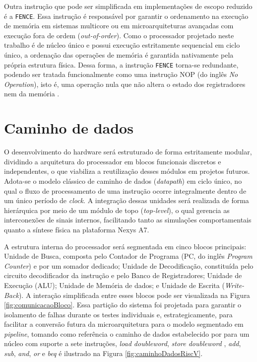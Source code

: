 Outra instrução que pode ser simplificada em implementações de escopo reduzido é a \texttt{FENCE}. Essa instrução é responsável por garantir o ordenamento na execução de memória em sistemas multicore ou em microarquiteturas avançadas com execução fora de ordem (\textit{out-of-order}). Como o processador projetado neste trabalho é de núcleo único e possui execução estritamente sequencial em ciclo único, a ordenação das operações de memória é garantida nativamente pela própria estrutura física. Dessa forma, a instrução \texttt{FENCE} torna-se redundante, podendo ser tratada funcionalmente como uma instrução NOP (do inglês \textit{No Operation}), isto é, uma operação nula que não altera o estado dos registradores nem da memória \cite{riscv_manual_2026}.


\section{Caminho de dados}
\label{sec:desenvolviemnto}

O desenvolvimento do hardware será estruturado de forma estritamente modular, dividindo a arquitetura do processador em blocos funcionais discretos e independentes, o que viabiliza a reutilização desses módulos em projetos futuros. Adota-se o modelo clássico de caminho de dados (\textit{datapath}) em ciclo único, no qual o fluxo de processamento de uma instrução ocorre integralmente dentro de um único período de \textit{clock}. A integração dessas unidades será realizada de forma hierárquica por meio de um módulo de topo (\textit{top-level}), o qual gerencia as interconexões de sinais internos, facilitando tanto as simulações comportamentais quanto a síntese física na plataforma Nexys A7.


A estrutura interna do processador será segmentada em cinco blocos principais: Unidade de Busca, composta pelo Contador de Programa (PC, do inglês \textit{Program Counter}) e por um somador dedicado; Unidade de Decodificação, constituída pelo circuito decodificador da instrução e pelo Banco de Registradores; Unidade de Execução (ALU); Unidade de Memória de dados; e Unidade de Escrita (\textit{Write-Back}). A interação simplificada entre esses blocos pode ser visualizada na Figura \ref{fig:comunicacaoBloco}. Essa partição do sistema foi projetada para garantir o isolamento de falhas durante os testes individuais e, estrategicamente, para facilitar a conversão futura da microarquitetura para o modelo segmentado em \textit{pipeline}, tomando como referência o caminho de dados estabelecido por  para um núcleo com suporte a sete instruções, \textit{ load doubleword}, \textit{store doubleword }, \textit{add}, \textit{sub}, \textit{and}, \textit{or} e \textit{beq} é ilustrado na Figura \ref{fig:caminhoDadosRiscV}.


